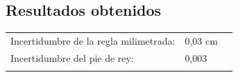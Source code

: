 \subsection{Resultados obtenidos}

\begin{table}[H]
\begin{tabular}{lll}
\cline{1-2}
\multicolumn{1}{|l|}{Incertidumbre de la regla milimetrada:} & \multicolumn{1}{l|}{0,03 cm} &  \\ \cline{1-2}
\multicolumn{1}{|l|}{Incertidumbre del pie de rey:}          & \multicolumn{1}{l|}{0,003}   &  \\ \cline{1-2}
                                                             &                              & 
\end{tabular}
\end{table}



